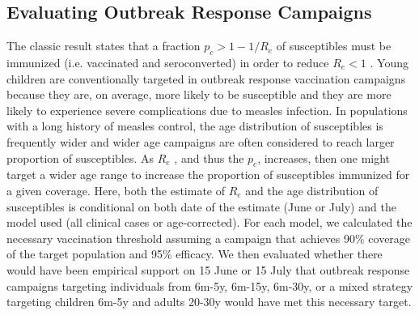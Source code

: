\subsection{Evaluating Outbreak Response Campaigns}\label{ori}

The classic result states that a fraction \(p_c \gt 1-1/R_e\) of susceptibles must be immunized (i.e. vaccinated and seroconverted) in order to reduce \(R_e \lt 1\) \cite{Anderson_1981}. Young children are conventionally targeted in outbreak response vaccination campaigns because they are, on average, more likely to be susceptible and they are more likely to experience severe complications due to measles infection. In populations with a long history of measles
control, the age distribution of susceptibles is frequently wider \cite{Ferrari_2013} and wider age campaigns are often considered to reach larger proportion of susceptibles. As \(R_e\) , and thus the \(p_c\), increases, then one might target a wider age range to increase the proportion of susceptibles immunized for a given coverage. Here, both the estimate of \(R_e\) and the age distribution of susceptibles is conditional on both date of the estimate (June or July) and the model used (all clinical cases or age-corrected). For each model, we calculated the necessary vaccination threshold assuming a campaign that achieves 90\% coverage of the target population and 95\% efficacy. We then evaluated whether there would have been empirical support on 15 June or 15 July that outbreak response campaigns targeting individuals from 6m-5y, 6m-15y, 6m-30y, or a mixed strategy targeting children 6m-5y and adults 20-30y would have met this necessary target.